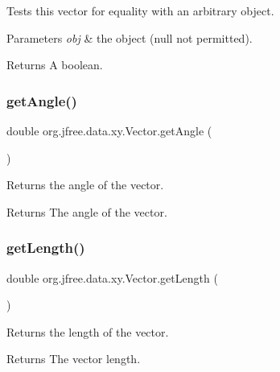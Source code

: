 Tests this vector for equality with an arbitrary object.


\begin{DoxyParams}{Parameters}
{\em obj} & the object ({\ttfamily null} not permitted).\\
\hline
\end{DoxyParams}
\begin{DoxyReturn}{Returns}
A boolean. 
\end{DoxyReturn}
\mbox{\label{classorg_1_1jfree_1_1data_1_1xy_1_1_vector_a08b5f748248c932e8256d04908dc5ea3}} 
\subsubsection{\texorpdfstring{get\+Angle()}{getAngle()}}
{\footnotesize\ttfamily double org.\+jfree.\+data.\+xy.\+Vector.\+get\+Angle (\begin{DoxyParamCaption}{ }\end{DoxyParamCaption})}

Returns the angle of the vector.

\begin{DoxyReturn}{Returns}
The angle of the vector. 
\end{DoxyReturn}
\mbox{\label{classorg_1_1jfree_1_1data_1_1xy_1_1_vector_ad61c905b160f07d9deed0b16f221f532}} 
\subsubsection{\texorpdfstring{get\+Length()}{getLength()}}
{\footnotesize\ttfamily double org.\+jfree.\+data.\+xy.\+Vector.\+get\+Length (\begin{DoxyParamCaption}{ }\end{DoxyParamCaption})}

Returns the length of the vector.

\begin{DoxyReturn}{Returns}
The vector length. 
\end{DoxyReturn}
\mbox{\label{classorg_1_1jfree_1_1data_1_1xy_1_1_vector_a07b9fb02180a1fe7c5a676974b443102}} 
